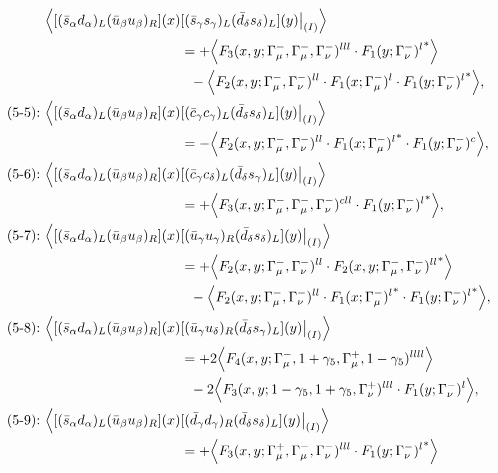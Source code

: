 \begin{align}
\Big\langle
[(\bar s_\alpha d_\alpha)_L(\bar u_\beta u_\beta)_R](x)&
[(\bar s_\gamma s_\gamma)_L(\bar d_\delta s_\delta)_L](y)\big|_{(I)}
\Big\rangle
\notag\\*
&=
 + \Big\langle F_3(x,y;\Gamma_\mu^-,\Gamma_\mu^-,\Gamma_\nu^-)^{lll} \cdot {F_1(y;\Gamma_\nu^-)^l}^*\Big\rangle
\notag\\*&\ \ 
 - \Big\langle F_2(x,y;\Gamma_\mu^-,\Gamma_\nu^-)^{ll} \cdot F_1(x;\Gamma_\mu^-)^l \cdot {F_1(y;\Gamma_\nu^-)^l}^*\Big\rangle,
\\
\mbox{(5-5):}\ 
\Big\langle
[(\bar s_\alpha d_\alpha)_L(\bar u_\beta u_\beta)_R](x)&
[(\bar c_\gamma c_\gamma)_L(\bar d_\delta s_\delta)_L](y)\big|_{(I)}
\Big\rangle
\notag\\*
&=
 - \Big\langle F_2(x,y;\Gamma_\mu^-,\Gamma_\nu^-)^{ll} \cdot {F_1(x;\Gamma_\mu^-)^l}^* \cdot F_1(y;\Gamma_\nu^-)^c\Big\rangle,
\\
\mbox{(5-6):}\ 
\Big\langle
[(\bar s_\alpha d_\alpha)_L(\bar u_\beta u_\beta)_R](x)&
[(\bar c_\gamma c_\delta)_L(\bar d_\delta s_\gamma)_L](y)\big|_{(I)}
\Big\rangle
\notag\\*
&=
 + \Big\langle F_3(x,y;\Gamma_\mu^-,\Gamma_\mu^-,\Gamma_\nu^-)^{cll} \cdot {F_1(y;\Gamma_\nu^-)^l}^*\Big\rangle,
\\
\mbox{(5-7):}\ 
\Big\langle
[(\bar s_\alpha d_\alpha)_L(\bar u_\beta u_\beta)_R](x)&
[(\bar u_\gamma u_\gamma)_R(\bar d_\delta s_\delta)_L](y)\big|_{(I)}
\Big\rangle
\notag\\*
&=
 + \Big\langle F_2(x,y;\Gamma_\mu^-,\Gamma_\nu^-)^{ll} \cdot {F_2(x,y;\Gamma_\mu^-,\Gamma_\nu^-)^{ll}}^*\Big\rangle
\notag\\*&\ \ 
 - \Big\langle F_2(x,y;\Gamma_\mu^-,\Gamma_\nu^-)^{ll} \cdot {F_1(x;\Gamma_\mu^-)^l}^* \cdot {F_1(y;\Gamma_\nu^-)^l}^*\Big\rangle,
\\
\mbox{(5-8):}\ 
\Big\langle
[(\bar s_\alpha d_\alpha)_L(\bar u_\beta u_\beta)_R](x)&
[(\bar u_\gamma u_\delta)_R(\bar d_\delta s_\gamma)_L](y)\big|_{(I)}
\Big\rangle
\notag\\*
&=
 + 2\Big\langle F_4(x,y;\Gamma_\mu^-,1+\gamma_5,\Gamma_\mu^+,1-\gamma_5)^{llll}\Big\rangle
\notag\\*&\ \ 
-2\Big\langle F_3(x,y;1-\gamma_5,1+\gamma_5,\Gamma_\nu^+)^{lll} \cdot F_1(y;\Gamma_\nu^-)^l\Big\rangle,
\\
\mbox{(5-9):}\ 
\Big\langle
[(\bar s_\alpha d_\alpha)_L(\bar u_\beta u_\beta)_R](x)&
[(\bar d_\gamma d_\gamma)_R(\bar d_\delta s_\delta)_L](y)\big|_{(I)}
\Big\rangle
\notag\\*
&=
 + \Big\langle F_3(x,y;\Gamma_\mu^+,\Gamma_\mu^-,\Gamma_\nu^-)^{lll} \cdot {F_1(y;\Gamma_\nu^-)^l}^*\Big\rangle

\end{align}
